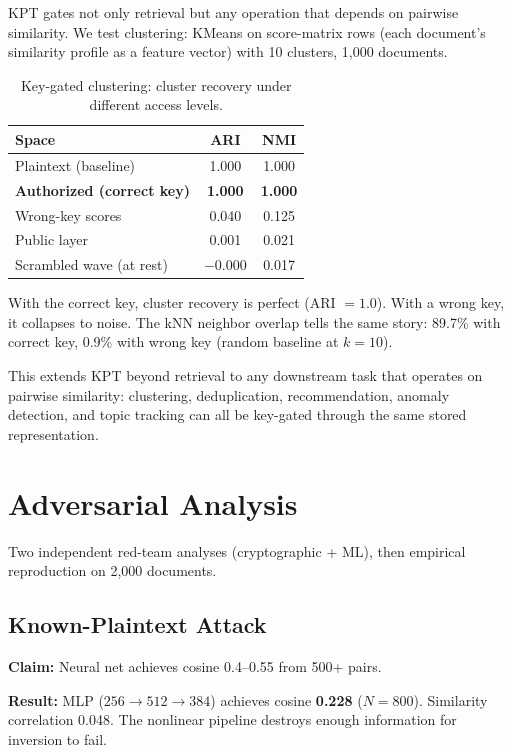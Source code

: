 \documentclass{article}
\begin{document}
KPT gates not only retrieval but any operation that depends on pairwise similarity.
We test clustering: KMeans on score-matrix rows (each document's similarity profile as a feature vector) with 10 clusters, 1{,}000 documents.

\begin{table}[htbp]
\centering
\caption{Key-gated clustering: cluster recovery under different access levels.}
\label{tab:clustering}
\begin{tabular}{@{}lcc@{}}
\toprule
\textbf{Space} & \textbf{ARI} & \textbf{NMI} \\
\midrule
Plaintext (baseline) & 1.000 & 1.000 \\
\textbf{Authorized (correct key)} & \textbf{1.000} & \textbf{1.000} \\
Wrong-key scores & 0.040 & 0.125 \\
Public layer & 0.001 & 0.021 \\
Scrambled wave (at rest) & $-$0.000 & 0.017 \\
\bottomrule
\end{tabular}
\end{table}

With the correct key, cluster recovery is perfect (ARI $= 1.0$).
With a wrong key, it collapses to noise.
The kNN neighbor overlap tells the same story: 89.7\% with correct key, 0.9\% with wrong key (random baseline at $k{=}10$).

This extends KPT beyond retrieval to any downstream task that operates on pairwise similarity: clustering, deduplication, recommendation, anomaly detection, and topic tracking can all be key-gated through the same stored representation.


\section{Adversarial Analysis}
\label{sec:adversarial}

Two independent red-team analyses (cryptographic + ML), then empirical reproduction on 2{,}000 documents.

\subsection{Known-Plaintext Attack}

\textbf{Claim:} Neural net achieves cosine 0.4--0.55 from 500+ pairs.

\textbf{Result:} MLP ($256 \to 512 \to 384$) achieves cosine \textbf{0.228} ($N{=}800$).
Similarity correlation 0.048.
The nonlinear pipeline destroys enough information for inversion to fail.
\end{document}
